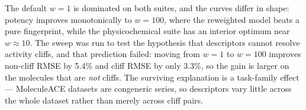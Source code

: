 The default $w = 1$ is dominated on both suites, and the curves differ in shape: potency
improves monotonically to $w = 100$, where the reweighted model beats a pure fingerprint, while
the physicochemical suite has an interior optimum near $w \approx 10$. The sweep was run to test
the hypothesis that descriptors cannot resolve activity cliffs, and that prediction failed:
moving from $w = 1$ to $w = 100$ improves non-cliff RMSE by 5.4\% and cliff RMSE by only 3.3\%,
so the gain is larger on the molecules that are \emph{not} cliffs. The surviving explanation is
a task-family effect --- MoleculeACE datasets are congeneric series, so descriptors vary little
across the whole dataset rather than merely across cliff pairs.
